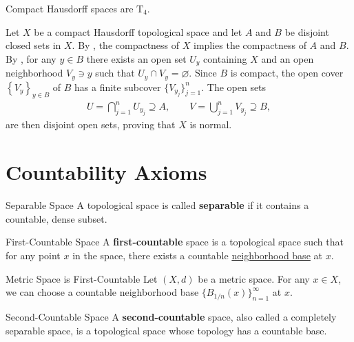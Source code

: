 \documentclass{report}
\begin{document}
\begin{proposition}{}{}
	Compact Hausdorff spaces are $\mathrm{T}_4$.
\end{proposition}
\begin{prf}
	Let $X$ be a compact Hausdorff topological space and let $A$ and $B$ be disjoint closed sets in $X$. By , the compactness of $X$ implies the compactness of $A$ and $B$. By , for any $y\in B$ there exists an open set $U_y$ containing $X$ and an open neighborhood $V_y\ni y$ such that $U_y\cap V_y =\varnothing$. Since $B$ is compact, the open cover $\left\lbrace V_y\right\rbrace _{y\in B}$ of $B$ has a finite subcover $\{V_{y_j}\}_{j=1}^n$. The open sets 
\begin{align*}
U=\bigcap_{j=1}^n U_{y_j} \supseteq A,  \qquad V=\bigcup_{j=1}^n V_{y_j} \supseteq B,
\end{align*}
are then disjoint open sets, proving that $X$ is normal.
\end{prf}


\section{Countability Axioms}

\begin{definition}{Separable Space}{}
	A topological space is called \textbf{separable} if it contains a countable, dense subset.
\end{definition}


\begin{definition}{First-Countable Space}{}
	A \textbf{first-countable} space is a topological space such that for any point $x$ in the space, there exists a countable \hyperref[th:neighborhood_base]{neighborhood base} at $x$.
\end{definition}

\begin{example}{Metric Space is First-Countable}{}
	Let $(X,d)$ be a metric space. For any $x\in X$, we can choose a countable neighborhood base $\{B_{1/n}(x)\}_{n=1}^\infty$ at $x$.
\end{example}

\begin{definition}{Second-Countable Space}{}
	A \textbf{second-countable} space, also called a completely separable space, is a topological space whose topology has a countable base.
\end{definition}
\end{document}
